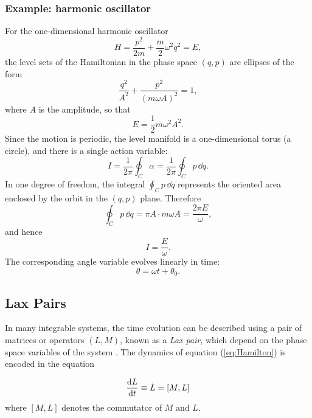 \subsubsection{Example: harmonic oscillator}
For the one-dimensional harmonic oscillator
\begin{equation}
    H = \frac{p^2}{2m} + \frac{m}{2}\omega^2 q^2 = E,
\end{equation}
the level sets of the Hamiltonian in the phase space $(q,p)$ are ellipses of the form
\begin{equation}
    \frac{q^2}{A^2} + \frac{p^2}{(m\omega A)^2} = 1,
\end{equation}
where $A$ is the amplitude, so that
\begin{equation}
    E = \frac{1}{2} m \omega^2 A^2.
\end{equation}
Since the motion is periodic, the level manifold is a one-dimensional torus (a circle), and there is a single action variable:
\begin{equation}
    I = \frac{1}{2\pi} \oint_C \alpha = \frac{1}{2\pi} \oint_C p \, \dd q.
\end{equation}
In one degree of freedom, the integral $\oint_C p \, \dd q$ represents the oriented area enclosed by the orbit in the $(q,p)$ plane. Therefore
\begin{equation}
    \oint_C p \, \dd q = \pi A \cdot m\omega A = \frac{2\pi E}{\omega},
\end{equation}
and hence
\begin{equation}
    I = \frac{E}{\omega}.
\end{equation}
The corresponding angle variable evolves linearly in time:
\begin{equation}
    \theta = \omega t + \theta_0.
\end{equation}

\subsection{Lax Pairs}

In many integrable systems, the time evolution can be described using a pair of matrices or operators $(L, M)$, known as a \emph{Lax pair}, which depend on the phase space variables of the system \cite{https://doi.org/10.1002/cpa.3160210503}. The dynamics of equation (\ref{eq:Hamilton}) is encoded in the equation

\begin{equation} \label{eq:Ham_Lax_Pairs}
    \dv{L}{t} \equiv \dot{L} = [M, L]
\end{equation}
where $[M, L]$ denotes the commutator of $M$ and $L$. 

